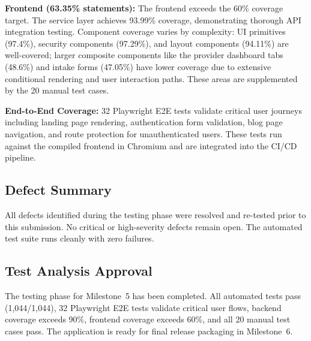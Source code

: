 \documentclass[12pt,letterpaper]{article}
\begin{document}
\textbf{Frontend (63.35\% statements):} The frontend exceeds the 60\% coverage target. The service layer achieves 93.99\% coverage, demonstrating thorough API integration testing. Component coverage varies by complexity: UI primitives (97.4\%), security components (97.29\%), and layout components (94.11\%) are well-covered; larger composite components like the provider dashboard tabs (48.6\%) and intake forms (47.05\%) have lower coverage due to extensive conditional rendering and user interaction paths. These areas are supplemented by the 20 manual test cases.

\textbf{End-to-End Coverage:} 32 Playwright E2E tests validate critical user journeys including landing page rendering, authentication form validation, blog page navigation, and route protection for unauthenticated users. These tests run against the compiled frontend in Chromium and are integrated into the CI/CD pipeline.

\subsection{Defect Summary}

All defects identified during the testing phase were resolved and re-tested prior to this submission. No critical or high-severity defects remain open. The automated test suite runs cleanly with zero failures.

\subsection{Test Analysis Approval}

The testing phase for Milestone~5 has been completed. All automated tests pass (1,044/1,044), 32 Playwright E2E tests validate critical user flows, backend coverage exceeds 90\%, frontend coverage exceeds 60\%, and all 20 manual test cases pass. The application is ready for final release packaging in Milestone~6.
\end{document}
